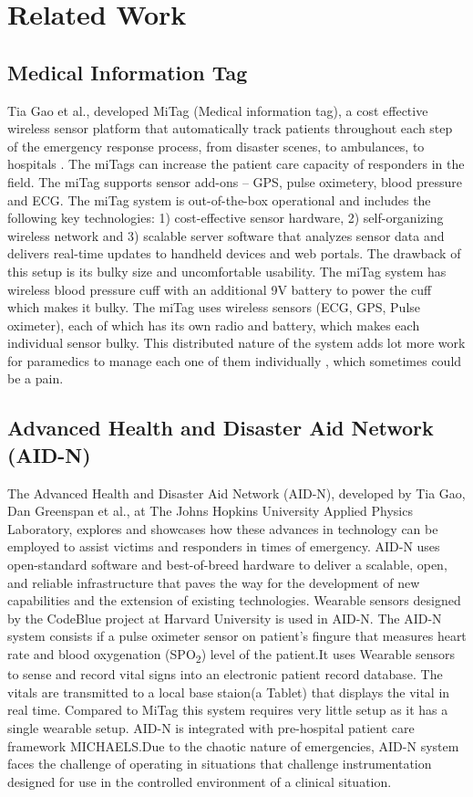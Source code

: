 \section{Related Work}

\subsection{Medical Information Tag}
Tia Gao et al., developed MiTag (Medical information tag), a cost effective 
wireless sensor platform that automatically track patients 
throughout each step of the emergency response process, from disaster 
scenes, to ambulances, to hospitals \cite{miTag}.
The miTags can increase 
the patient care capacity of responders in the field. The miTag  supports sensor add-ons – GPS, pulse oximetery, blood pressure and ECG. 
The miTag system is out-of-the-box operational and includes the following key technologies: 1) cost-effective sensor hardware, 2) 
self-organizing wireless network and 3) scalable server software 
that analyzes sensor data and delivers real-time updates to 
handheld devices and web portals. The drawback of this setup is its bulky size and uncomfortable usability. The miTag system has wireless blood pressure cuff with an additional 9V battery to power the cuff which makes it bulky. The miTag uses wireless sensors (ECG, GPS, Pulse oximeter), each of which has its own radio and battery, which makes each individual sensor bulky. This distributed nature of the system adds lot more work for paramedics to manage each one of them individually , which sometimes could be a pain. 
\subsection{Advanced Health
	and Disaster Aid Network (AID-N)}
The Advanced Health and Disaster Aid Network (AID-N), developed by Tia Gao, Dan Greenspan et al., \cite{AID-N} at The Johns Hopkins University Applied Physics Laboratory, explores and showcases how these advances in technology can be employed to assist victims and responders in times of emergency. AID-N uses open-standard software and best-of-breed hardware to deliver a scalable, open, and reliable infrastructure that paves the way for the development of new capabilities and the extension of existing technologies. 
Wearable sensors designed by the CodeBlue project at Harvard University is used in AID-N. The AID-N system consists if a pulse oximeter sensor on patient's fingure that measures heart rate and blood oxygenation (SPO\textsubscript{2}) level of the patient.It uses Wearable sensors to sense and record vital signs into an electronic patient record database. The vitals are transmitted to a local base staion(a Tablet) that displays the vital in real time. Compared to MiTag this system requires very little setup as it has a single wearable setup. AID-N is integrated with pre-hospital patient care framework MICHAELS.Due to the chaotic nature of emergencies, AID-N system
faces the challenge of operating in situations that challenge instrumentation designed for use in
the controlled environment of a clinical situation. 



